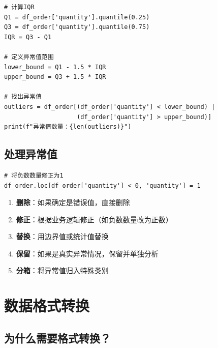 \documentclass[12pt,a4paper]{article}
\begin{document}
\begin{lstlisting}[caption={使用IQR方法检测异常值}]
# 计算IQR
Q1 = df_order['quantity'].quantile(0.25)
Q3 = df_order['quantity'].quantile(0.75)
IQR = Q3 - Q1

# 定义异常值范围
lower_bound = Q1 - 1.5 * IQR
upper_bound = Q3 + 1.5 * IQR

# 找出异常值
outliers = df_order[(df_order['quantity'] < lower_bound) | 
                    (df_order['quantity'] > upper_bound)]
print(f"异常值数量：{len(outliers)}")
\end{lstlisting}

\subsection{处理异常值}

\begin{lstlisting}[caption={处理异常值}]
# 将负数数量修正为1
df_order.loc[df_order['quantity'] < 0, 'quantity'] = 1
\end{lstlisting}

\begin{theorybox}[异常值处理策略]
\begin{enumerate}
    \item \textbf{删除}：如果确定是错误值，直接删除
    \item \textbf{修正}：根据业务逻辑修正（如负数数量改为正数）
    \item \textbf{替换}：用边界值或统计值替换
    \item \textbf{保留}：如果是真实异常情况，保留并单独分析
    \item \textbf{分箱}：将异常值归入特殊类别
\end{enumerate}
\end{theorybox}

\section{数据格式转换}

\subsection{为什么需要格式转换？}
\end{document}
